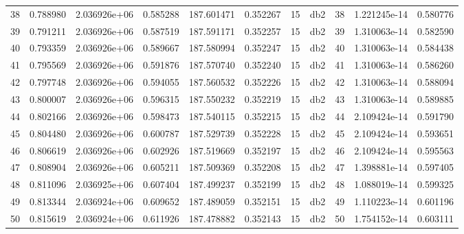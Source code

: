 \begin{tabular}{lrrrrrrlrrr}
38   &    0.788980 &        2.036926e+06 &  0.585288 &              187.601471 &    0.352267 &      15 &          db2 &     38 &   1.221245e-14 &      0.580776 \\
39   &    0.791211 &        2.036926e+06 &  0.587519 &              187.591171 &    0.352257 &      15 &          db2 &     39 &   1.310063e-14 &      0.582590 \\
40   &    0.793359 &        2.036926e+06 &  0.589667 &              187.580994 &    0.352247 &      15 &          db2 &     40 &   1.310063e-14 &      0.584438 \\
41   &    0.795569 &        2.036926e+06 &  0.591876 &              187.570740 &    0.352240 &      15 &          db2 &     41 &   1.310063e-14 &      0.586260 \\
42   &    0.797748 &        2.036926e+06 &  0.594055 &              187.560532 &    0.352226 &      15 &          db2 &     42 &   1.310063e-14 &      0.588094 \\
43   &    0.800007 &        2.036926e+06 &  0.596315 &              187.550232 &    0.352219 &      15 &          db2 &     43 &   1.310063e-14 &      0.589885 \\
44   &    0.802166 &        2.036926e+06 &  0.598473 &              187.540115 &    0.352215 &      15 &          db2 &     44 &   2.109424e-14 &      0.591790 \\
45   &    0.804480 &        2.036926e+06 &  0.600787 &              187.529739 &    0.352228 &      15 &          db2 &     45 &   2.109424e-14 &      0.593651 \\
46   &    0.806619 &        2.036926e+06 &  0.602926 &              187.519669 &    0.352197 &      15 &          db2 &     46 &   2.109424e-14 &      0.595563 \\
47   &    0.808904 &        2.036926e+06 &  0.605211 &              187.509369 &    0.352208 &      15 &          db2 &     47 &   1.398881e-14 &      0.597405 \\
48   &    0.811096 &        2.036925e+06 &  0.607404 &              187.499237 &    0.352199 &      15 &          db2 &     48 &   1.088019e-14 &      0.599325 \\
49   &    0.813344 &        2.036924e+06 &  0.609652 &              187.489059 &    0.352151 &      15 &          db2 &     49 &   1.110223e-14 &      0.601196 \\
50   &    0.815619 &        2.036924e+06 &  0.611926 &              187.478882 &    0.352143 &      15 &          db2 &     50 &   1.754152e-14 &      0.603111 \\

\end{tabular}
